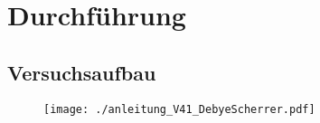 \section{Durchführung}\label{sec:Durchführung}
\subsection{Versuchsaufbau}
\begin{figure}[h]
		\centering
		\texttt{[image: ./anleitung\_V41\_DebyeScherrer.pdf]}
		\caption{}
		\label{fig:}
\end{figure}

